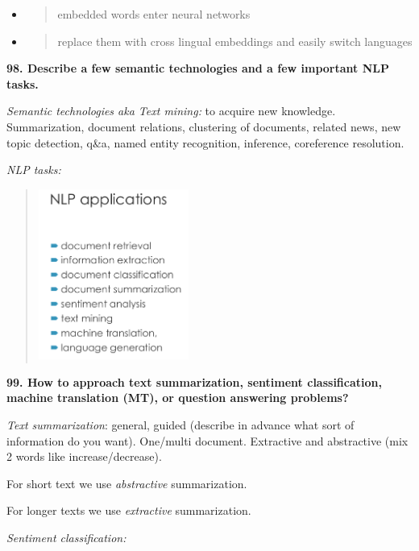 \begin{itemize}
\item
  \begin{quote}
  embedded words enter neural networks
  \end{quote}
\end{itemize}

\begin{itemize}
\item
  \begin{quote}
  replace them with cross lingual embeddings and easily switch languages
  \end{quote}
\end{itemize}

\textbf{98. Describe a few semantic technologies and a few important NLP
tasks.}

\textit{Semantic technologies aka Text mining:} to acquire new
knowledge. Summarization, document relations, clustering of documents,
related news, new topic detection, q\&a, named entity recognition,
inference, coreference resolution.

\textit{NLP tasks:}

\begin{quote}
\includegraphics[width=1.93777in,height=2.20364in]{media/image29.png}
\end{quote}

\textbf{99. How to approach text summarization, sentiment
classification, machine translation (MT), or question answering
problems?}

\textit{Text summarization}: general, guided (describe in advance
what sort of information do you want). One/multi document. Extractive
and abstractive (mix 2 words like increase/decrease).

For short text we use \emph{abstractive} summarization.

For longer texts we use \emph{extractive} summarization.

\textit{Sentiment classification:}

